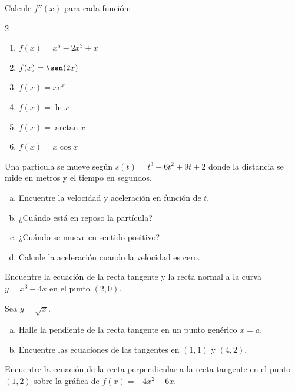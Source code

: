 \begin{prob}
Calcule $f''(x)$ para cada función:
\begin{multicols}{2}
\begin{enumerate}
    \item $f(x) = x^5 - 2x^3 + x$
    \item $f(x) = \sen(2x)$
    \item $f(x) = xe^x$
    \item $f(x) = \ln x$
    \item $f(x) = \arctan x$
    \item $f(x) = x\cos x$
\end{enumerate}
\end{multicols}
\end{prob}

\begin{prob}
Una partícula se mueve según $s(t) = t^3 - 6t^2 + 9t + 2$ donde la
distancia se mide en metros y el tiempo en segundos.
\begin{enumerate}[a)]
    \item Encuentre la velocidad y aceleración en función de $t$.
    \item ¿Cuándo está en reposo la partícula?
    \item ¿Cuándo se mueve en sentido positivo?
    \item Calcule la aceleración cuando la velocidad es cero.
\end{enumerate}
\end{prob}

\begin{prob}
Encuentre la ecuación de la recta tangente y la recta normal a la curva
$y = x^3 - 4x$ en el punto $(2, 0)$.
\end{prob}

\begin{prob}
Sea $y = \sqrt{x}$.
\begin{enumerate}[a)]
    \item Halle la pendiente de la recta tangente en un punto genérico $x=a$.
    \item Encuentre las ecuaciones de las tangentes en $(1,1)$ y $(4,2)$.
\end{enumerate}
\end{prob}

\begin{prob}
Encuentre la ecuación de la recta perpendicular a la recta tangente en
el punto $(1, 2)$ sobre la gráfica de $f(x) = -4x^2 + 6x$.
\end{prob}

